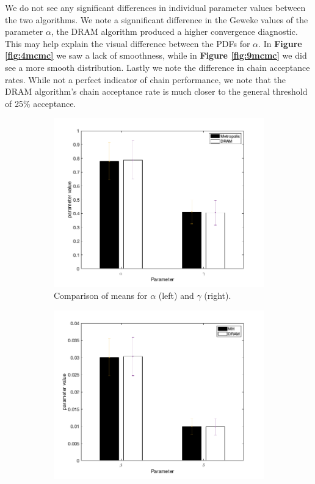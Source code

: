 \documentclass{article}
\begin{document}
We do not see any significant differences in individual parameter values between the two algorithms. We note a signnificant difference in the Geweke values of the parameter $\alpha$, the DRAM algorithm produced a higher convergence diagnostic. This may help explain the visual difference between the PDFs for $\alpha$. In \textbf{Figure \ref{fig:4mcmc}} we saw a lack of smoothness, while in \textbf{Figure \ref{fig:9mcmc}} we did see a more smooth distribution. Lastly we note the difference in chain acceptance rates. While not a perfect indicator of chain performance, we note that the DRAM algorithm's chain acceptance rate is much closer to the general threshold of 25\% acceptance. 
\begin{figure}[H]
\begin{subfigure}{.5\textwidth}
  \centering
  \includegraphics[width=1\linewidth]{MCMC_figs/met_lv_final/mh_dram_paramComp1.png}
  \caption{Comparison of means for $\alpha$ (left) and $\gamma$ (right).}
  \label{fig:12amcmcm}
\end{subfigure}
\begin{subfigure}{.5\textwidth}
  \centering
  \includegraphics[width=1\linewidth]{MCMC_figs/met_lv_final/mh_dram_paramComp2.png}

\end{subfigure}
\end{figure}
\end{document}
